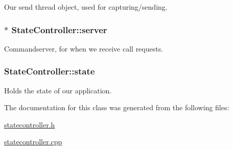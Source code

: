 \-Our send thread object, used for capturing/sending. 

\hypertarget{class_state_controller_a3c06ffd0c04de0c000d07d02b03557f1}{
\subsubsection[{server}]{$\ast$ {\bf \-State\-Controller\-::server}}}
\label{class_state_controller_a3c06ffd0c04de0c000d07d02b03557f1}


\-Commandserver, for when we receive call requests. 

\hypertarget{class_state_controller_a5bed5dd92c56a936d1e3be5ab4d74dde}{
\subsubsection[{state}]{ {\bf \-State\-Controller\-::state}}}
\label{class_state_controller_a5bed5dd92c56a936d1e3be5ab4d74dde}


\-Holds the state of our application. 



\-The documentation for this class was generated from the following files\-:\begin{DoxyCompactItemize}
\item 
\hyperlink{statecontroller_8h}{statecontroller.\-h}\item 
\hyperlink{statecontroller_8cpp}{statecontroller.\-cpp}\end{DoxyCompactItemize}
